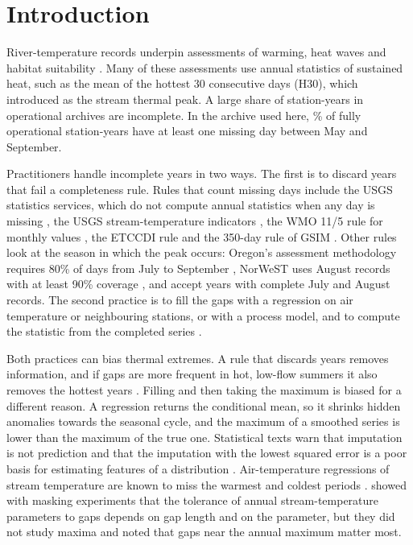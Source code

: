 \documentclass[draft]{agujournal2025}
\begin{document}
\section{Introduction}
River-temperature records underpin assessments of warming, heat waves and habitat suitability \cite{caissie2006,michel2020,vanhamel2024}. Many of these assessments use annual statistics of sustained heat, such as the mean of the hottest 30 consecutive days (H30), which  introduced as the stream thermal peak. A large share of station-years in operational archives are incomplete. In the archive used here, \TWarmIncomplete\% of fully operational station-years have at least one missing day between May and September.

Practitioners handle incomplete years in two ways. The first is to discard years that fail a completeness rule. Rules that count missing days include the USGS statistics services, which do not compute annual statistics when any day is missing \cite{kiang2018}, the USGS stream-temperature indicators \cite{johnson2024usgs}, the WMO 11/5 rule for monthly values \cite{wmo2017}, the ETCCDI rule \cite{zhang2011} and the 350-day rule of GSIM \cite{gudmundsson2018}. Other rules look at the season in which the peak occurs: Oregon's assessment methodology requires 80\% of days from July to September \cite{oregon2024}, NorWeST uses August records with at least 90\% coverage \cite{isaak2017}, and  accept years with complete July and August records. The second practice is to fill the gaps with a regression on air temperature or neighbouring stations, or with a process model, and to compute the statistic from the completed series \cite{toffolon2015,piccolroaz2016}.

Both practices can bias thermal extremes. A rule that discards years removes information, and if gaps are more frequent in hot, low-flow summers it also removes the hottest years \cite{sowder2012}. Filling and then taking the maximum is biased for a different reason. A regression returns the conditional mean, so it shrinks hidden anomalies towards the seasonal cycle, and the maximum of a smoothed series is lower than the maximum of the true one. Statistical texts warn that imputation is not prediction and that the imputation with the lowest squared error is a poor basis for estimating features of a distribution \cite{vanbuuren2018,naf2023}. Air-temperature regressions of stream temperature are known to miss the warmest and coldest periods \cite{arismendi2014}.  showed with masking experiments that the tolerance of annual stream-temperature parameters to gaps depends on gap length and on the parameter, but they did not study maxima and noted that gaps near the annual maximum matter most.
\end{document}
